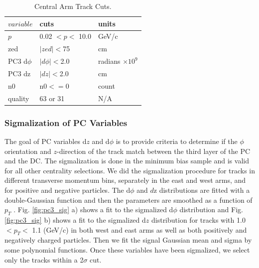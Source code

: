 \begin{table}[h!]
\caption{Central Arm Track Cuts.}
\begin{center}
    \begin{tabular}{| l | l | l | }
    \hline
    $variable$ & cuts  & units\\ \hline
    $p$ & 0.02 $< p < $ 10.0  & GeV/c\\ \hline
    zed & $|zed| <$75  & cm \\ \hline
    PC3 d$\phi$ & $|d\phi|<$2.0  & radians $\times10^{9}$ \\ \hline
    PC3 dz & $|dz|<$2.0 & cm \\ \hline
    n0 & n0$<=$0 & count \\ \hline
    quality & 63 or 31& N/A \\ \hline
    \end{tabular}
\end{center}
\end{table}

\subsubsection{Sigmalization of PC Variables}
\label{sec:pc_sigmala}
The goal of PC variables d$z$ and d$\phi$ is to provide criteria to determine if the $\phi$ orientation and $z$-direction of the track match between the third layer of the PC and the DC. The sigmalization is done in the minimum bias sample and is valid for all other centrality selections.
We did the sigmalization procedure for tracks in different transverse momentum bins, separately in the east
and west arms, and for positive and negative particles. The d$\phi$ and $d$z distributions
are fitted with a double-Gaussian function and then the parameters are smoothed as
a function of $p_T$ . Fig. \ref{fig:pc3_sig} a) shows a fit to the sigmalized
d$\phi$ distribution and Fig. \ref{fig:pc3_sig} b) shows a fit to the sigmalized d$z$ distribution for tracks with 1.0 $< p_T <$ 1.1 (GeV/c)
in both west and east arms as well as both positively and negatively charged particles.
Then we fit the signal Gaussian mean and sigma by some polynomial functions.  Once these variables have been sigmalized, we select only
the tracks within a 2$\sigma$ cut.

